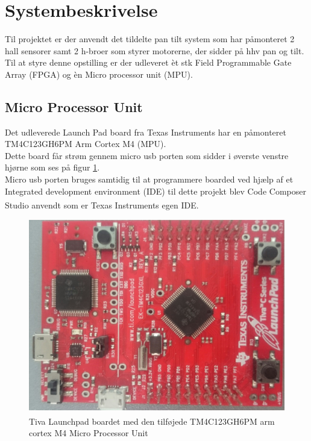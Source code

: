 \section{Systembeskrivelse}
Til projektet er der anvendt det tildelte pan tilt system som har påmonteret 2 hall sensorer samt 2 h-broer som styrer motorerne, der sidder på hhv pan og tilt.\\
Til at styre denne opstilling er der udleveret èt stk Field Programmable Gate Array (FPGA) og èn Micro processor unit (MPU).
\\
\subsection{Micro Processor Unit}
Det udleverede Launch Pad board fra Texas Instruments har en påmonteret TM4C123GH6PM Arm Cortex M4 (MPU)\cite{TM4C123GH6PMDatasheet}.\\
Dette board får strøm gennem micro usb porten som sidder i øverste venstre hjørne som ses på figur \ref{fig:TivaLaunchPad}.\\
Micro usb porten bruges samtidig til at programmere boarded ved hjælp af et Integrated development environment (IDE) til dette projekt blev Code Composer Studio \textsuperscript{\texttrademark} anvendt som er Texas Instruments egen IDE.

\begin{figure}[!ht]
	\begin{center}
		\includegraphics[scale=0.1, angle =270]{Billeder/TivaLaunchPad.JPG}
	\end{center}
\caption{Tiva\textsuperscript{\texttrademark} Launchpad boardet med den tilføjede TM4C123GH6PM arm cortex M4 Micro Processor Unit}
\label{fig:TivaLaunchPad}
\end{figure}

